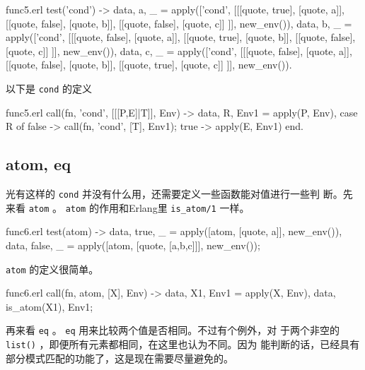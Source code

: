 \documentclass[preview,multi,crop=false,border=1in,class=memoir]{standalone}
\begin{document}
\begin{preview-page}
\begin{SourceCode}[100][127]{func5.erl}
test('cond') ->
    {{data, a}, _} =
        apply(['cond',
               [[[quote, true],
                 [quote, a]],
                [[quote, false],
                 [quote, b]],
                [[quote, false],
                 [quote, c]]
               ]], new_env()),
    {{data, b}, _} =
        apply(['cond',
               [[[quote, false],
                 [quote, a]],
                [[quote, true],
                 [quote, b]],
                [[quote, false],
                 [quote, c]]
               ]], new_env()),
    {{data, c}, _} =
        apply(['cond',
               [[[quote, false],
                 [quote, a]],
                [[quote, false],
                 [quote, b]],
                [[quote, true],
                 [quote, c]]
               ]], new_env()).
\end{SourceCode}

以下是 \verb|cond| 的定义

\begin{SourceCode}[39][46]{func5.erl}
call({fn, 'cond'}, [[[P,E]|T]], Env) ->
    {{data, R}, Env1} = apply(P, Env),
    case R of
        false ->
            call({fn, 'cond'}, [T], Env1);
        true ->
            apply(E, Env1)
    end.
\end{SourceCode}

\subsection{atom, eq}

光有这样的 \verb|cond| 并没有什么用，还需要定义一些函数能对值进行一些判
断。先来看 \verb|atom| 。 \verb|atom| 的作用和Erlang里
\verb|is_atom/1| 一样。

\begin{SourceCode}[146][150]{func6.erl}
test(atom) ->
    {{data, true}, _} =
        apply([atom, [quote, a]], new_env()),
    {{data, false}, _} =
        apply([atom, [quote, [a,b,c]]], new_env());
\end{SourceCode}

\verb|atom| 的定义很简单。

\begin{SourceCode}[47][49]{func6.erl}
call({fn, atom}, [X], Env) ->
    {{data, X1}, Env1} = apply(X, Env),
    {{data, is_atom(X1)}, Env1};
\end{SourceCode}

再来看 \verb|eq| 。 \verb|eq| 用来比较两个值是否相同。不过有个例外，对
于两个非空的 \verb|list()| ，即便所有元素都相同，在这里也认为不同。因为
能判断的话，已经具有部分模式匹配的功能了，这是现在需要尽量避免的。


\end{preview-page}
\end{document}
